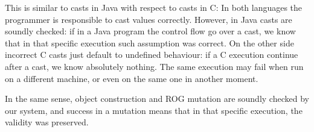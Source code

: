 This is similar to casts in Java with respect to casts in C:
In both languages the programmer is responsible to cast values correctly.
However, in Java casts are soundly checked: if in a Java program the control flow go over a cast,
 we know that in that specific
execution such assumption was correct.
On the other side incorrect C casts just default to undefined behaviour:
if a C execution continue after a cast, we know absolutely nothing. The same execution
 may fail when run on a different machine, 
or even on the same one in another moment.

In the same sense, object construction and ROG mutation are soundly checked by our system,
and success in a mutation means that in that specific execution, the validity was preserved.




%
%  
% 
%
%
%
%
%
%
%
%
%
%
%
%
%
%
%
%
%


\saveSpace
